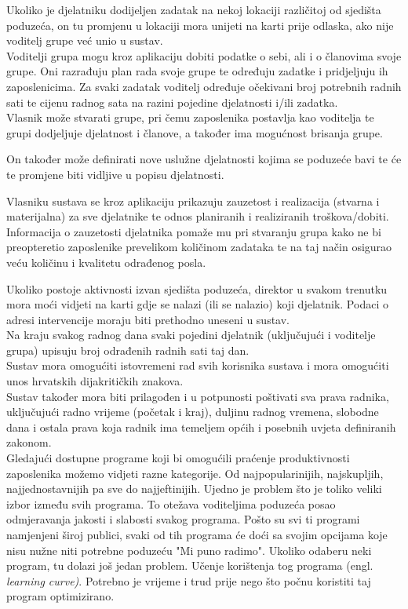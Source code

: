 		Ukoliko je djelatniku dodijeljen zadatak na nekoj lokaciji različitoj od sjedišta poduzeća, on tu promjenu u lokaciji mora unijeti na karti prije odlaska, ako nije voditelj grupe već unio u sustav.\\
		
		Voditelji grupa mogu kroz aplikaciju dobiti podatke o sebi, ali i o članovima svoje grupe. Oni razrađuju plan rada svoje grupe te određuju zadatke i pridjeljuju ih zaposlenicima. Za svaki zadatak voditelj određuje očekivani broj potrebnih radnih sati te cijenu radnog sata na razini pojedine djelatnosti i/ili zadatka. \\
		
		Vlasnik može stvarati grupe, pri čemu zaposlenika postavlja kao voditelja te grupi dodjeljuje djelatnost i članove, a također ima mogućnost brisanja grupe.  
	
		On također može definirati nove uslužne djelatnosti kojima se poduzeće bavi te će te promjene biti vidljive u popisu djelatnosti.  
	
		Vlasniku sustava se kroz aplikaciju prikazuju zauzetost i realizacija (stvarna i materijalna) za sve djelatnike te odnos planiranih i realiziranih troškova/dobiti. Informacija o zauzetosti djelatnika pomaže mu pri stvaranju grupa kako ne bi preopteretio zaposlenike prevelikom količinom zadataka te na taj način osigurao veću količinu i kvalitetu odrađenog posla. 
	
		Ukoliko postoje aktivnosti izvan sjedišta poduzeća, direktor u svakom trenutku mora moći vidjeti na karti gdje se nalazi (ili se nalazio) koji djelatnik. Podaci o adresi intervencije moraju biti prethodno uneseni u sustav. \\
		
		Na kraju svakog radnog dana svaki pojedini djelatnik (uključujući i voditelje grupa) upisuju broj odrađenih radnih sati taj dan.\\
		
		Sustav mora omogućiti istovremeni rad svih korisnika sustava i mora omogućiti unos hrvatskih dijakritičkih znakova.\\
		
		Sustav također mora biti prilagođen i u potpunosti poštivati sva prava radnika, uključujući radno vrijeme (početak i kraj), duljinu radnog vremena, slobodne dana i ostala prava koja radnik ima temeljem općih i posebnih uvjeta definiranih zakonom.\\
		
		Gledajući dostupne programe koji bi omogućili praćenje produktivnosti zaposlenika  možemo vidjeti razne kategorije. Od najpopularinijih, najskupljih, najjednostavnijih pa sve do najjeftinijih. Ujedno je problem što je toliko veliki izbor između svih programa. To otežava voditeljima poduzeća posao odmjeravanja jakosti i slabosti svakog programa. Pošto su svi ti programi namjenjeni široj publici, svaki od tih programa će doći sa svojim opcijama koje nisu nužne niti potrebne poduzeću "Mi puno radimo".
		Ukoliko odaberu neki program, tu dolazi još jedan problem. Učenje korištenja tog programa (engl. \textit{learning curve)}. Potrebno je vrijeme i trud prije nego što počnu koristiti taj program optimizirano.\\
		
